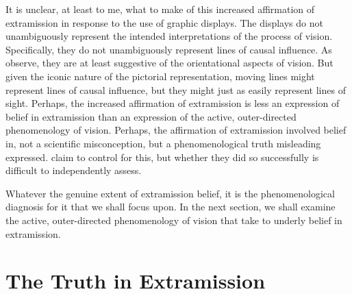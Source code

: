 It is unclear, at least to me, what to make of this increased affirmation of extramission in response to the use of graphic displays. The displays do not unambiguously represent the intended interpretations of the process of vision. Specifically, they do not unambiguously represent lines of causal influence. As \citet{Winer:1996as} observe, they are at least suggestive of the orientational aspects of vision. But given the iconic nature of the pictorial representation, moving lines might represent lines of causal influence, but they might just as easily represent lines of sight. Perhaps, the increased affirmation of extramission is less an expression of belief in extramission than an expression of the active, outer-directed phenomenology of vision. Perhaps, the affirmation of extramission involved belief in, not a scientific misconception, but a phenomenological truth misleading expressed. \citet{Winer:1996as} claim to control for this, but whether they did so successfully is difficult to independently assess.

Whatever the genuine extent of extramission belief, it is the phenomenological diagnosis for it that we shall focus upon. In the next section, we shall examine the active, outer-directed phenomenology of vision that \citet{Winer:1996as} take to underly belief in extramission.


\section{The Truth in Extramission} %
\label{sec:the_truth_in_extramission}



